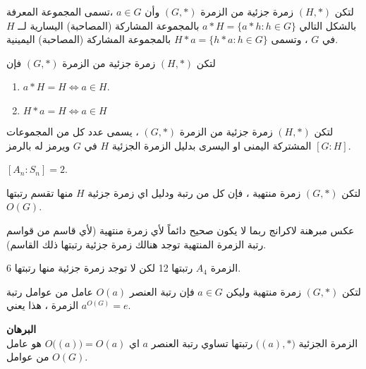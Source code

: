  
 
 \begin{definition}
 	لتكن $(H, *)$ زمرة جزئية من الزمرة $(G, *)$ وأن $a\in G$ ،تسمى  المجموعة المعرفة بالشكل التالي 
 	$a* H = \{a * h : h\in G\}$
 	بالمجموعة المشاركة (المصاحبة)  اليسارية لــ $H$ في $G$  ، وتسمى $H*a = \{h*a:h\in G\}$ بالمجموعة المشاركة (المصاحبة) اليمينية.  
 \end{definition}
 
 
 \begin{theorem}
 	لتكن $(H, *)$ زمرة جزئية من الزمرة $(G, *)$ فإن
 	\begin{enumerate}
 		\item $a*H=H \iff a\in H$.
 		\item $H*a = H \iff a\in H$
 	\end{enumerate}
 \end{theorem}
 
 \begin{definition}
 	لتكن $(H, *)$ زمرة جزئية من الزمرة $(G, *)$ ، يسمى عدد كل من المجموعات المشتركة اليمنى او  اليسرى بدليل الزمرة الجزئية $H$ في $G$ ويرمز له بالرمز $[G:H]$.
 \end{definition}
 \begin{example}
 	$[A_n : S_n] = 2$.
 \end{example}
 
 \begin{theorem}[]
 	لتكن $(G, *)$ زمرة منتهية ، فإن كل من رتبة ودليل اي زمرة جزئية $H$ منها تقسم رتبتها $O(G)$. 
 \end{theorem}
 
 \begin{note}
 	عكس مبرهنة لاكرانج ربما لا يكون صحيح دائماً لأي زمرة منتهية (لأي قاسم من قواسم رتبة الزمرة المنتهية توجد هنالك زمرة جزئية رتبتها ذلك القاسم).
 \end{note}
 
 \begin{example}
 	الزمرة $A_4$ رتبتها 12 لكن لا توجد زمرة جزئية منها رتبتها 6.
 \end{example}
 
 \begin{corollary}
 	لتكن $(G, *) $ زمرة منتهية وليكن $a\in G$ فإن رتبة العنصر $O(a)$ عامل من عوامل رتبة الزمرة ، هذا يعني $a^{O(G)} =e$.
 \end{corollary}
 \noindent
 \textbf{البرهان}\\
 \noindent
 الزمرة الجزئية $\big((a), *\big)$ رتبتها تساوي رتبة العنصر $a$ اي
 $O\big((a)\big) = O(a)$
 هو عامل من عوامل $O(G)$.
 
